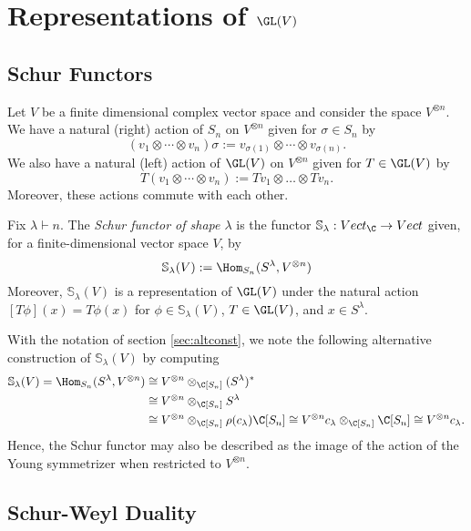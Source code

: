 \documentclass[../main.tex]{subfiles}
\begin{document}
\section{Representations of $ \GL(V) $}

\subsection{Schur Functors}

Let $ V $ be a finite dimensional complex vector space and consider the space $ V^{\otimes n} $. We have a natural (right) action of $ S_{n} $ on $ V^{\otimes n} $ given for $ \sigma\in S_{n} $ by 
\[
    (v_{1}\otimes \cdots \otimes v_{n}) \sigma := v_{\sigma(1)}\otimes \cdots \otimes v_{\sigma(n)}.
\]
We also have a natural (left) action of $ \GL(V) $ on $ V^{\otimes n} $ given for $ T\in \GL(V) $ by
\[
    T(v_{1} \otimes \cdots \otimes v_{n}) := Tv_{1} \otimes \dots \otimes Tv_{n}.
\]
Moreover, these actions commute with each other.


\begin{definition}
    Fix $ \lambda\vdash n $. The \textit{Schur functor of shape $\lambda$} is the functor $ \mathbb{S}_{\lambda}:Vect_{\C}\to Vect$
    given, for a finite-dimensional vector space $ V $, by
    \[
        \mathbb{S}_{\lambda}(V) := \Hom_{S_{n}}(S^{\lambda}, V^{\otimes n})
    \]
    Moreover, $ \mathbb{S}_{\lambda}(V)$ is a representation of $ \GL(V) $ under the natural action $ [T \phi](x) = T \phi(x) $ for $ \phi\in \mathbb{S}_{\lambda}(V) $, $ T\in\GL(V) $, and $ x\in S^{\lambda} $.
\end{definition}
With the notation of section \ref{sec:altconst}, we note the following alternative construction of $ \mathbb{S}_{\lambda}(V) $ by computing
\begin{align*}
    \mathbb{S}_{\lambda}(V) = \Hom_{S_{n}}(S^{\lambda},V^{\otimes n}) &\cong V^{\otimes n}\otimes_{\C[S_{n}]}(S^{\lambda})^{*} \\
    &\cong V^{\otimes n}\otimes_{\C[S_{n}]}S^{\lambda} \\
    &\cong V^{\otimes n}\otimes_{\C[S_{n}]}\rho(c_{\lambda})\C[S_{n}]  \cong V^{\otimes n} c_{\lambda}\otimes_{\C[S_{n}]} \C[S_{n}]  \cong V^{\otimes n}c_{\lambda}.
\end{align*}
Hence, the Schur functor may also be described as the image of the action of the Young symmetrizer when restricted to $ V^{\otimes n} $.
\subsection{Schur-Weyl Duality}
\end{document}
